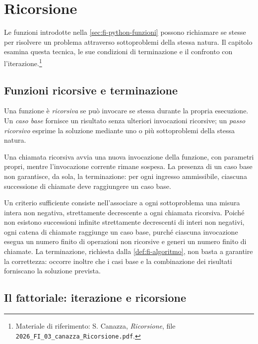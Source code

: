 \chapter{Ricorsione}
\label{chap:ricorsione}

Le funzioni introdotte nella \cref{sec:fi-python-funzioni} possono
richiamare se stesse per risolvere un problema attraverso sottoproblemi
della stessa natura. Il capitolo esamina questa tecnica, le sue condizioni
di terminazione e il confronto con l'iterazione.\footnote{Materiale
di riferimento: S. Canazza, \emph{Ricorsione}, file
\nolinkurl{2026_FI_03_canazza_Ricorsione.pdf}.}

\section{Funzioni ricorsive e terminazione}
\label{sec:fi-ricorsione-terminazione}

\begin{definition}[Ricorsione]
Una funzione è \emph{ricorsiva} se può invocare se stessa durante la
propria esecuzione. Un \emph{caso base} fornisce un risultato senza
ulteriori invocazioni ricorsive; un \emph{passo ricorsivo} esprime la
soluzione mediante uno o più sottoproblemi della stessa natura.
\end{definition}

Una chiamata ricorsiva avvia una nuova invocazione della funzione, con
parametri propri, mentre l'invocazione corrente rimane sospesa.
La presenza di un caso base non garantisce, da sola, la terminazione:
per ogni ingresso ammissibile, ciascuna successione di chiamate deve
raggiungere un caso base.

Un criterio sufficiente consiste nell'associare a ogni sottoproblema
una misura intera non negativa, strettamente decrescente a ogni
chiamata ricorsiva. Poiché non esistono successioni infinite strettamente
decrescenti di interi non negativi, ogni catena di chiamate raggiunge
un caso base, purché ciascuna invocazione esegua un numero finito
di operazioni non ricorsive e generi un numero finito di chiamate.
La terminazione, richiesta dalla \cref{def:fi-algoritmo}, non basta
a garantire la correttezza: occorre inoltre che i casi base e la
combinazione dei risultati forniscano la soluzione prevista.

\section{Il fattoriale: iterazione e ricorsione}
\label{sec:fi-fattoriale}

